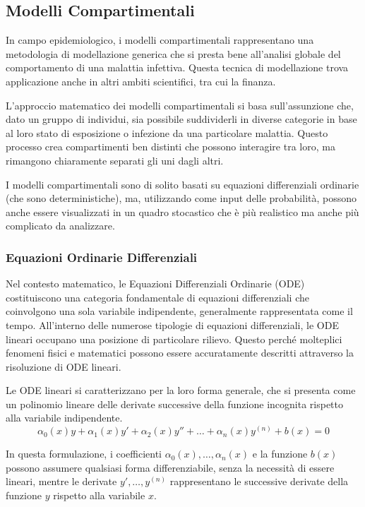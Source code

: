 \subsection{Modelli Compartimentali}

In campo epidemiologico, i modelli compartimentali \cite{ENDERLE2012359} rappresentano una 
metodologia di modellazione generica che si presta bene all'analisi 
globale del comportamento di una malattia infettiva. Questa tecnica di 
modellazione trova applicazione anche in altri ambiti scientifici, tra 
cui la finanza.

L'approccio matematico dei modelli compartimentali si basa sull'assunzione 
che, dato un gruppo di individui, sia possibile suddividerli in diverse 
categorie in base al loro stato di esposizione o infezione da una 
particolare malattia. Questo processo crea compartimenti ben distinti che 
possono interagire tra loro, ma rimangono chiaramente separati gli uni 
dagli altri.

I modelli compartimentali sono di solito basati su equazioni differenziali 
ordinarie (che sono deterministiche), ma, utilizzando come input delle probabilità, 
possono anche essere visualizzati in un quadro stocastico che è più realistico ma 
anche più complicato da analizzare.

\subsubsection*{Equazioni Ordinarie Differenziali}

Nel contesto matematico, le Equazioni Differenziali Ordinarie (ODE) 
costituiscono una categoria fondamentale di equazioni differenziali 
che coinvolgono una sola variabile indipendente, generalmente 
rappresentata come il tempo. All'interno delle numerose tipologie di 
equazioni differenziali, le ODE lineari occupano una posizione di 
particolare rilievo. Questo perché molteplici fenomeni fisici e 
matematici possono essere accuratamente descritti attraverso la 
risoluzione di ODE lineari.

Le ODE lineari si caratterizzano per la loro forma generale, 
che si presenta come un polinomio lineare delle derivate successive 
della funzione incognita rispetto alla variabile indipendente.
$$\alpha_0(x)y + \alpha_1(x)y' + \alpha_2(x)y'' + \ldots + \alpha_n(x)y^{(n)} + b(x) = 0$$

In questa formulazione, i coefficienti $\alpha_0(x), \ldots, \alpha_n(x)$ 
e la funzione $b(x)$ possono assumere qualsiasi forma differenziabile, 
senza la necessità di essere lineari, mentre le derivate 
$y', \ldots, y^{(n)}$ rappresentano le successive derivate della funzione 
$y$ rispetto alla variabile $x$.

